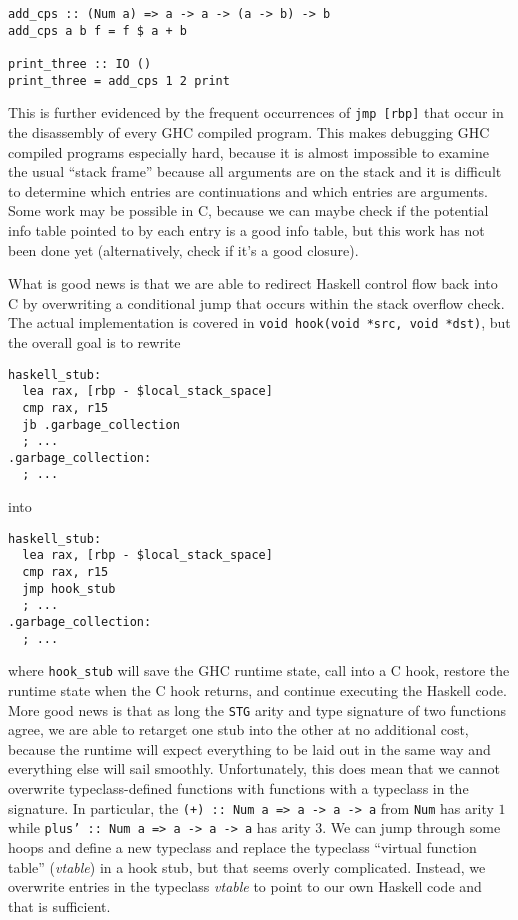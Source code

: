 \documentclass[letterpaper]{article}
\begin{document}
\begin{verbatim}
add_cps :: (Num a) => a -> a -> (a -> b) -> b
add_cps a b f = f $ a + b

print_three :: IO ()
print_three = add_cps 1 2 print
\end{verbatim}

This is further evidenced by the frequent occurrences of \texttt{jmp
[rbp]} that occur in the disassembly of every GHC compiled program. This makes
debugging GHC compiled programs especially hard, because it is almost impossible
to examine the usual ``stack frame'' because all arguments are on the stack and
it is difficult to determine which entries are continuations and which entries
are arguments. Some work may be possible in C, because we can maybe check if the
potential info table pointed to by each entry is a good info table, but this
work has not been done yet (alternatively, check if it's a good closure).


What is good news is that we are able to redirect Haskell control flow back into
C by overwriting a conditional jump that occurs within the stack overflow check.
The actual implementation is covered in \texttt{void hook(void *src, void
*dst)}, but the overall goal is to rewrite

\begin{verbatim}
haskell_stub:
  lea rax, [rbp - $local_stack_space]
  cmp rax, r15
  jb .garbage_collection
  ; ...
.garbage_collection:
  ; ...
\end{verbatim}

into

\begin{verbatim}
haskell_stub:
  lea rax, [rbp - $local_stack_space]
  cmp rax, r15
  jmp hook_stub
  ; ...
.garbage_collection:
  ; ...
\end{verbatim}

where \texttt{hook_stub} will save the GHC runtime state, call into a C
hook, restore the runtime state when the C hook returns, and continue executing
the Haskell code. More good news is that as long the \texttt{STG} arity and type
signature of two functions agree, we are able to retarget one stub into the
other at no additional cost, because the runtime will expect everything to be
laid out in the same way and everything else will sail smoothly. Unfortunately,
this does mean that we cannot overwrite typeclass-defined functions with
functions with a typeclass in the signature. In particular, the
\texttt{(+) :: Num a => a -> a -> a} from \texttt{Num}
has arity $1$ while \texttt{plus' :: Num a => a -> a -> a} has
arity $3$. We can jump through some hoops and define a new typeclass and replace
the typeclass ``virtual function table'' (\textit{vtable}) in a hook stub, but
that seems overly complicated. Instead, we overwrite entries in the typeclass
\textit{vtable} to point to our own Haskell code and that is sufficient.
\end{document}
